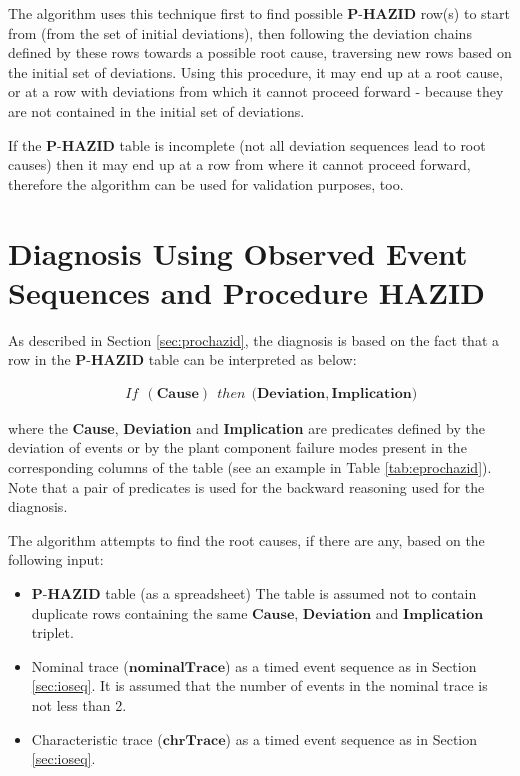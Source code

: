 \documentclass[conference]{IEEEtran}
\begin{document}
The algorithm uses this technique first to find possible  $\textbf{P-HAZID}$ row(s) to start from (from the set of initial deviations), then following the deviation chains defined by these rows towards a possible root cause, traversing new rows based on the initial set of deviations. Using this procedure, it may end up at a root cause, or at a row with deviations from which it cannot proceed forward - because they are not contained in the initial set of deviations. 

If the $\textbf{P-HAZID}$ table is incomplete (not all deviation sequences lead to root causes) then it may end up at a row from where it cannot proceed forward, therefore the algorithm can be used for validation purposes, too. 

\section{Diagnosis Using Observed Event Sequences and Procedure HAZID}
\label{sec:reasoning}

As described in Section \ref{sec:prochazid}, the diagnosis is based on the fact that a row in the $\textbf{P-HAZID}$
table can be interpreted as below:
\begin{small}
\begin{eqnarray*}
&& If~~\mathbf{(Cause)}~~then~~\mathbf{(Deviation,Implication})
\end{eqnarray*}
\end{small}
\noindent where the \textbf{Cause}, \textbf{Deviation} and \textbf{Implication}
 are predicates
 defined by the deviation of events or by the plant component failure modes
present in the corresponding columns of the table (see an example in Table \ref{tab:eprochazid}).
Note that a pair of predicates is used for the backward reasoning used for the diagnosis.

 
The algorithm attempts to find the root causes, if there are any, based on the following input:
\begin{itemize}
	\item $\textbf{P-HAZID}$ table (as a spreadsheet) The table is assumed not to contain duplicate rows containing the same $\mathbf{Cause}$, $\mathbf{Deviation}$ and $\mathbf{Implication}$ triplet.
	\item Nominal trace ($\mathbf{nominalTrace}$) as a timed event sequence as in Section \ref{sec:ioseq}. It is assumed that the number of events in the nominal trace is not less than 2.
	\item Characteristic trace ($\mathbf{chrTrace}$) as a timed event sequence as in Section \ref{sec:ioseq}.
\end{itemize}
\end{document}
